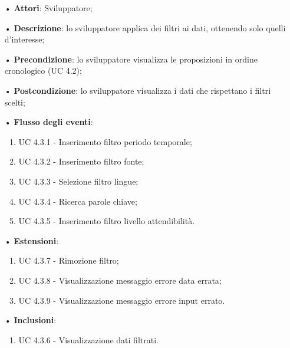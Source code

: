 \begin{itemize}
	\item[•]\textbf{Attori}: Sviluppatore;
	\item[•]\textbf{Descrizione}: lo sviluppatore applica dei filtri ai dati, ottenendo solo quelli d'interesse;
	\item[•]\textbf{Precondizione}: lo sviluppatore visualizza le proposizioni in ordine cronologico (UC 4.2);
	\item[•]\textbf{Postcondizione}: lo sviluppatore visualizza i dati che rispettano i filtri scelti;
	\item[•]\textbf{Flusso degli eventi}:
	\begin{enumerate}
		\item UC 4.3.1 - Inserimento filtro periodo temporale;
		\item UC 4.3.2 - Inserimento filtro {fonte};
		\item UC 4.3.3 - Selezione filtro lingue;
		\item UC 4.3.4 - Ricerca parole chiave;
		\item UC 4.3.5 - Inserimento filtro livello attendibilità.
	\end{enumerate}
	\item[•]\textbf{Estensioni}:
	\begin{enumerate}
		\item UC 4.3.7 - Rimozione filtro;
		\item UC 4.3.8 - Visualizzazione messaggio errore data errata;
		\item UC 4.3.9 - Visualizzazione messaggio errore input errato.
	\end{enumerate}
	\item[•]\textbf{Inclusioni}:
	\begin{enumerate}
		\item UC 4.3.6 - Visualizzazione dati filtrati.
	\end{enumerate}
\end{itemize}
